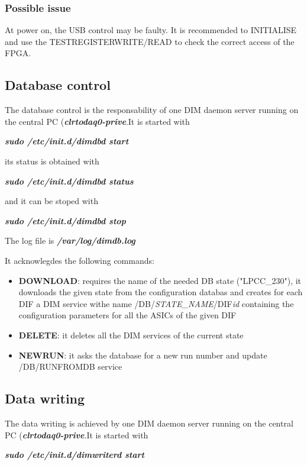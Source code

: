 \documentclass[english]{article}
\begin{document}
\subsubsection{Possible issue}

At power on, the USB control may be faulty. It is recommended to INITIALISE and use the TESTREGISTERWRITE/READ to check the correct access of the FPGA.

\subsection{Database control}

The database control is the responsability of one DIM daemon server running on the central PC ({\bf \sl clrtodaq0-prive}.It is started with

{\sl \bf sudo /etc/init.d/dimdbd start }

its status is obtained with 

{\sl \bf sudo /etc/init.d/dimdbd status }

and it can be stoped with

{\sl \bf sudo /etc/init.d/dimdbd stop }
 
 The log file is {\sl \bf /var/log/dimdb.log }
 
 It acknowlegdes the following commands:
 \begin{itemize}
\item {\bf DOWNLOAD}: requires the name of the needed DB state ("LPCC\_230"), it downloads the given state from the configuration databas and creates for each DIF a DIM service withe name /DB/{\sl STATE\_NAME}/DIF{\sl id} containing the configuration parameters for all the ASICs of the given DIF 
\item {\bf DELETE}: it deletes all the DIM services of the current state
\item {\bf NEWRUN}: it asks the database for a new run number and update /DB/RUNFROMDB service

\end{itemize}

\subsection {Data writing}

The data writing is achieved by one DIM daemon server running on the central PC ({\bf \sl clrtodaq0-prive}.It is started with

{\sl \bf sudo /etc/init.d/dimwriterd start }
\end{document}
